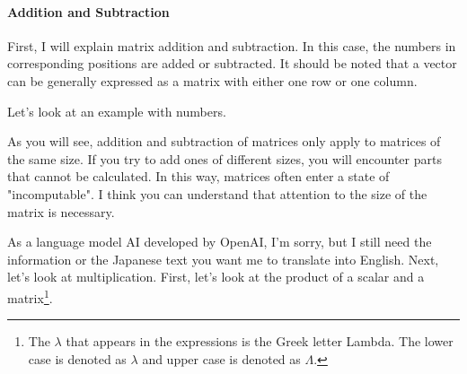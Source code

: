 \documentclass{ltjsbook}
\begin{document}
\paragraph{Addition and Subtraction}
First, I will explain matrix addition and subtraction. In this case, the numbers in corresponding positions are added or subtracted. It should be noted that a vector can be generally expressed as a matrix with either one row or one column.



Let's look at an example with numbers.


As you will see, addition and subtraction of matrices only apply to matrices of the same size. If you try to add ones of different sizes, you will encounter parts that cannot be calculated. In this way, matrices often enter a state of "incomputable". I think you can understand that attention to the size of the matrix is necessary.


As a language model AI developed by OpenAI, I'm sorry, but I still need the information or the Japanese text you want me to translate into English.
Next, let's look at multiplication. First, let's look at the product of a scalar and a matrix\footnote{The $\lambda$ that appears in the expressions is the Greek letter Lambda. The lower case is denoted as $\lambda$ and upper case is denoted as $\Lambda$.}.


\end{document}
